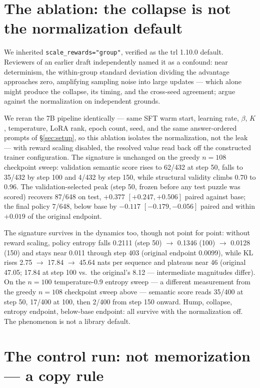 \documentclass{article}
\begin{document}
\section{The ablation: the collapse is not the normalization default}
\label{sec:ablation}

We inherited \texttt{scale\_rewards="group"}, verified as the trl 1.10.0
default. Reviewers of an earlier draft independently named it as a
confound: near determinism, the within-group standard deviation dividing
the advantage approaches zero, amplifying sampling noise into large updates
--- which alone might produce the collapse, its timing, and the cross-seed
agreement; \citet{drgrpo} argue against the normalization on independent
grounds.

We reran the 7B pipeline identically --- same SFT warm start, learning
rate, $\beta$, $K$, temperature, LoRA rank, epoch count, seed, and the same
answer-ordered prompts of \S\ref{sec:setup}, so this ablation isolates the
normalization, not the leak --- with
reward scaling disabled, the resolved value read back off the constructed
trainer configuration. The signature is unchanged on the greedy
$n=108$ checkpoint sweep: validation semantic score rises to 62/432 at step
50, falls to 35/432 by step 100 and 4/432 by step 150, while structural
validity climbs 0.70 to 0.96. The validation-selected peak (step 50, frozen
before any test puzzle was scored) recovers 87/648 on test,
$+0.377$ $[+0.247, +0.506]$ paired against base; the final policy 7/648,
below base by $-0.117$ $[-0.179, -0.056]$ paired and within $+0.019$ of
the original endpoint.

The signature survives in the dynamics too, though not point for point:
without reward scaling, policy entropy falls 0.2111 (step 50) $\to$ 0.1346
(100) $\to$ 0.0128 (150) and stays near 0.011 through step 403 (original
endpoint 0.0099), while KL rises 2.75 $\to$ 17.84 $\to$ 45.64 nats per
sequence and plateaus near 46 (original 47.05; 17.84 at step 100 vs.\ the original's
8.12 --- intermediate magnitudes differ). On the $n=100$
temperature-0.9 entropy sweep --- a different measurement from the greedy
$n=108$ checkpoint sweep above --- semantic score reads 35/400 at step 50,
17/400 at 100, then 2/400 from step 150 onward. Hump, collapse, entropy
endpoint, below-base endpoint: all survive with the normalization off. The
phenomenon is not a library default.

\section{The control run: not memorization --- a copy rule}
\label{sec:control}
\end{document}
